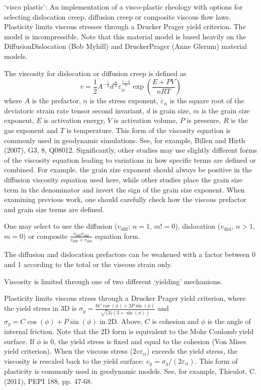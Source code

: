\begin{itemize}

`visco plastic': An implementation of a visco-plastic rheology with options for selecting dislocation creep, diffusion creep or composite viscous flow laws.  Plasticity limits viscous stresses through a Drucker Prager yield criterion. The model is incompressible. Note that this material model is based heavily on the DiffusionDislocation (Bob Myhill) and DruckerPrager (Anne Glerum) material models. 

 The viscosity for dislocation or diffusion creep is defined as \[v = \frac 12 A^{-\frac{1}{n}} d^{\frac{m}{n}} \dot{\varepsilon}_{ii}^{\frac{1-n}{n}} \exp\left(\frac{E + PV}{nRT}\right)\] where $A$ is the prefactor, $n$ is the stress exponent, $\dot{\varepsilon}_{ii}$ is the square root of the deviatoric strain rate tensor second invariant, $d$ is grain size, $m$ is the grain size exponent, $E$ is activation energy, $V$ is activation volume, $P$ is pressure, $R$ is the gas exponent and $T$ is temperature. This form of the viscosity equation is commonly used in geodynamic simulations. See, for example, Billen and Hirth (2007), G3, 8, Q08012. Significantly, other studies may use slightly different forms of the viscosity equation leading to variations in how specific terms are defined or combined. For example, the grain size exponent should always be positive in the diffusion viscosity equation used here, while other studies place the grain size term in the denominator and invert the sign of the grain size exponent. When examining previous work, one should carefully check how the viscous prefactor and grain size terms are defined. 

 One may select to use the diffusion ($v_{\text{diff}}$; $n=1$, $m!=0$), dislocation ($v_{\text{disl}}$, $n>1$, $m=0$) or composite $\frac{v_{\text{diff}} v_{\text{disl}}}{v_{\text{diff}}+v_{\text{disl}}}$ equation form. 

 The diffusion and dislocation prefactors can be weakened with a factor between 0 and 1 according to the total or the viscous strain only. 

 Viscosity is limited through one of two different `yielding' mechanisms. 

Plasticity limits viscous stress through a Drucker Prager yield criterion, where the yield stress in 3D is  $\sigma_y = \frac{6C\cos(\phi) + 2P\sin(\phi)} {\sqrt(3)(3+\sin(\phi))}$ and $\sigma_y = C\cos(\phi) + P\sin(\phi)$ in 2D. Above, $C$ is cohesion and $\phi$  is the angle of internal friction.  Note that the 2D form is equivalent to the Mohr Coulomb yield surface.  If $\phi$ is 0, the yield stress is fixed and equal to the cohesion (Von Mises yield criterion). When the viscous stress ($2v{\varepsilon}_{ii}$) exceeds the yield stress, the viscosity is rescaled back to the yield surface: $v_{y}=\sigma_{y}/(2{\varepsilon}_{ii})$. This form of plasticity is commonly used in geodynamic models. See, for example, Thieulot, C. (2011), PEPI 188, pp. 47-68. 


\end{itemize}
